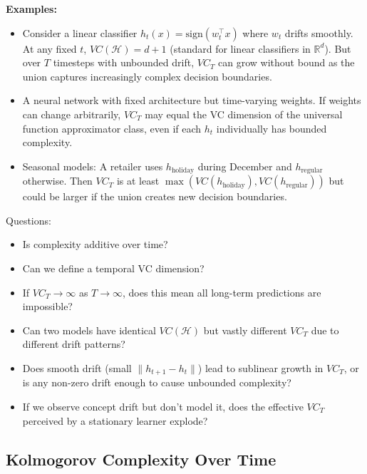   \textbf{Examples:}
  \begin{itemize}
    \item Consider a linear classifier $h_{t}(x) = \text{sign}(w_{t}^{\top}
      x)$ where $w_{t}$ drifts smoothly. At any fixed $t$, $VC(\mathcal{H}
      ) = d+1$ (standard for linear classifiers in $\mathbb{R}^{d}$).
      But over $T$ timesteps with unbounded drift, $VC_{T}$ can grow without
      bound as the union captures increasingly complex decision boundaries.

    \item A neural network with fixed architecture but time-varying weights.
      If weights can change arbitrarily, $VC_{T}$ may equal the VC dimension
      of the universal function approximator class, even if each $h_{t}$
      individually has bounded complexity.

    \item Seasonal models: A retailer uses $h_{\text{holiday}}$ during
      December and $h_{\text{regular}}$ otherwise. Then $VC_{T}$ is at least
      $\max(VC(h_{\text{holiday}}), VC(h_{\text{regular}}))$ but could be
      larger if the union creates new decision boundaries.
  \end{itemize}

  Questions:
  \begin{itemize}
    \item Is complexity additive over time?

    \item Can we define a temporal VC dimension?

    \item If $VC_{T}\to \infty$ as $T \to \infty$, does this mean all
      long-term predictions are impossible?

    \item Can two models have identical $VC(\mathcal{H})$ but vastly different
      $VC_{T}$ due to different drift patterns?

    \item Does smooth drift (small $\|h_{t+1}- h_{t}\|$) lead to sublinear
      growth in $VC_{T}$, or is any non-zero drift enough to cause
      unbounded complexity?

    \item If we observe concept drift but don't model it, does the
      effective $VC_{T}$ perceived by a stationary learner explode?
  \end{itemize}

  \subsection*{Kolmogorov Complexity Over Time}

